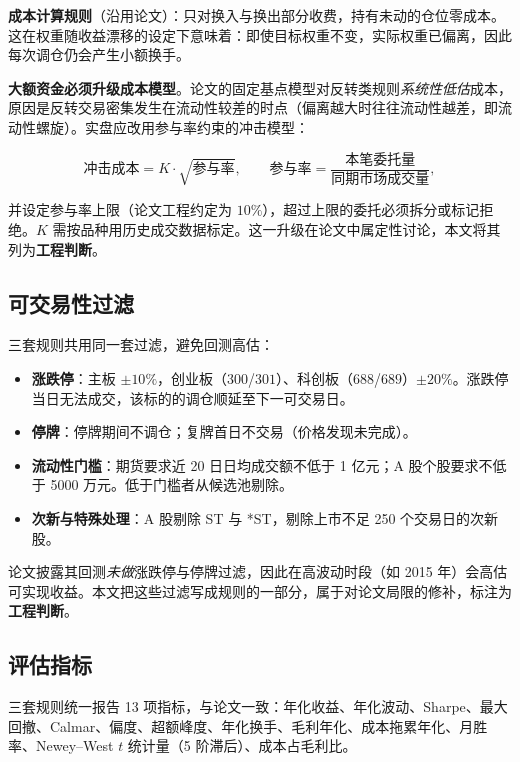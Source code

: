 \textbf{成本计算规则}（沿用论文）：只对换入与换出部分收费，持有未动的仓位零成本。这在权重随收益漂移的设定下意味着：即使目标权重不变，实际权重已偏离，因此每次调仓仍会产生小额换手。

\textbf{大额资金必须升级成本模型}。论文的固定基点模型对反转类规则\emph{系统性低估}成本，原因是反转交易密集发生在流动性较差的时点（偏离越大时往往流动性越差，即流动性螺旋\cite{brunnermeier2009}）。实盘应改用参与率约束的冲击模型：

\begin{equation}
\text{冲击成本} = K\cdot\sqrt{\text{参与率}},\qquad
\text{参与率}=\frac{\text{本笔委托量}}{\text{同期市场成交量}} ,
\end{equation}

并设定参与率上限（论文工程约定为 $10\%$），超过上限的委托必须拆分或标记拒绝。$K$ 需按品种用历史成交数据标定。这一升级在论文中属定性讨论，本文将其列为\textbf{工程判断}。

\subsection{可交易性过滤}

三套规则共用同一套过滤，避免回测高估：

\begin{itemize}[leftmargin=2.2em]
  \item \textbf{涨跌停}：主板 $\pm10\%$，创业板（$300$/$301$）、科创板（$688$/$689$）$\pm20\%$。涨跌停当日无法成交，该标的的调仓顺延至下一可交易日。
  \item \textbf{停牌}：停牌期间不调仓；复牌首日不交易（价格发现未完成）。
  \item \textbf{流动性门槛}：期货要求近 20 日日均成交额不低于 1 亿元；A 股个股要求不低于 5000 万元。低于门槛者从候选池剔除。
  \item \textbf{次新与特殊处理}：A 股剔除 ST 与 *ST，剔除上市不足 250 个交易日的次新股。
\end{itemize}

论文披露其回测\emph{未做}涨跌停与停牌过滤，因此在高波动时段（如 2015 年）会高估可实现收益。本文把这些过滤写成规则的一部分，属于对论文局限的修补，标注为\textbf{工程判断}。

\subsection{评估指标}

三套规则统一报告 13 项指标，与论文一致：年化收益、年化波动、Sharpe、最大回撤、Calmar、偏度、超额峰度、年化换手、毛利年化、成本拖累年化、月胜率、Newey--West $t$ 统计量（5 阶滞后）、成本占毛利比。

